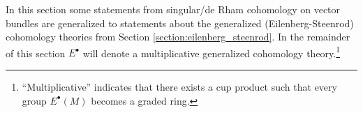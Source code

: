    In this section some statements from singular/de Rham cohomology on vector bundles are generalized to statements about the generalized (Eilenberg-Steenrod) cohomology theories from Section \ref{section:eilenberg_steenrod}. In the remainder of this section $E^\bullet$ will denote a multiplicative generalized cohomology theory.\footnote{``Multiplicative'' indicates that there exists a cup product such that every group $E^\bullet(M)$ becomes a graded ring.}

